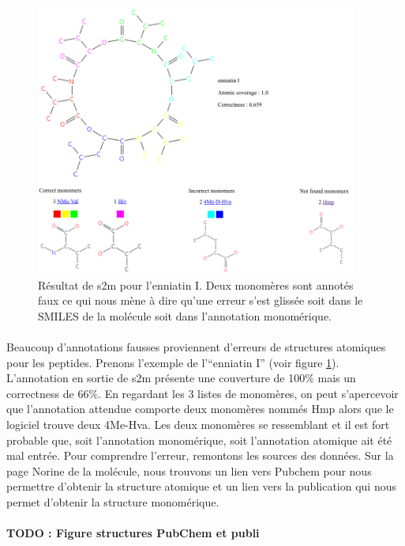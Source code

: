 \documentclass[12pt,french,twoside]{report}
\begin{document}
\begin{figure}[!ht]
  \begin{center}
    \includegraphics[width=400px]{Figures/s2m/results/s2m_enniati.png}
    \caption{\label{s2m_enniati}Résultat de s2m pour l'enniatin I.
    Deux monomères sont annotés faux ce qui nous mène à dire qu'une erreur s'est glissée soit dans le SMILES de la molécule soit dans l'annotation monomérique.}
  \end{center}
\end{figure}

\paragraph{}Beaucoup d'annotations fausses proviennent d'erreurs de structures atomiques pour les peptides.
Prenons l'exemple de l'``enniatin I'' (voir figure \ref{s2m_enniati}).
L'annotation en sortie de s2m présente une couverture de 100\% mais un correctness de 66\%.
En regardant les 3 listes de monomères, on peut s'apercevoir que l'annotation attendue comporte deux monomères nommés Hmp alors que le logiciel trouve deux 4Me-Hva.
Les deux monomères se ressemblant et il est fort probable que, soit l'annotation monomérique, soit l'annotation atomique ait été mal entrée.
Pour comprendre l'erreur, remontons les sources des données.
Sur la page Norine de la molécule, nous trouvons un lien vers Pubchem pour nous permettre d'obtenir la structure atomique et un lien vers la publication qui nous permet d'obtenir la structure monomérique.

\paragraph{TODO : Figure structures PubChem et publi}
\end{document}

